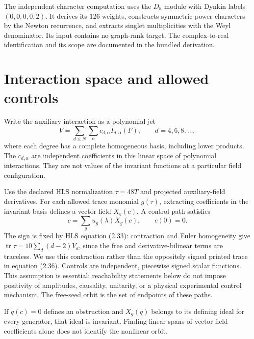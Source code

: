 \documentclass[11pt]{article}
\newcommand{\tr}{\operatorname{tr}}
\begin{document}
The independent character computation uses the $D_5$ module with Dynkin labels
$(0,0,0,0,2)$. It derives its 126 weights, constructs symmetric-power characters
by the Newton recurrence, and extracts singlet multiplicities with the Weyl
denominator. Its input contains no graph-rank target. The complex-to-real
identification and its scope are documented in the bundled derivation.

\section{Interaction space and allowed controls}
Write the auxiliary interaction as a polynomial jet
\begin{equation}
 V=\sum_{d\leq N}\sum_\alpha c_{d,\alpha}I_{d,\alpha}(F),\qquad d=4,6,8,\ldots,
\end{equation}
where each degree has a complete homogeneous basis, including lower products.
The $c_{d,\alpha}$ are independent coefficients in this linear space of
polynomial interactions. They are not values of the invariant functions at a
particular field configuration.

Use the declared HLS normalization $\tau=48T$ and projected auxiliary-field
derivatives. For each allowed trace monomial $g(\tau)$, extracting coefficients
in the invariant basis defines a vector field $X_g(c)$. A control path satisfies
\begin{equation}
 \dot c=\sum_g u_g(\lambda)X_g(c),\qquad c(0)=0.
\end{equation}
The sign is fixed by HLS equation (2.33): contraction and Euler homogeneity
give $\tr\tau=10\sum_d(d-2)V_d$, since the free and derivative-bilinear
terms are traceless. We use this contraction rather than the oppositely signed
printed trace in equation (2.36).
Controls are independent, piecewise signed scalar functions. This assumption
is essential: reachability statements below do not impose positivity of
amplitudes, causality, unitarity, or a physical experimental control mechanism.
The free-seed orbit is the set of endpoints of these paths.

If $q(c)=0$ defines an obstruction and $X_g(q)$ belongs to its defining ideal
for every generator, that ideal is invariant. Finding linear spans of vector
field coefficients alone does not identify the nonlinear orbit.
\end{document}
